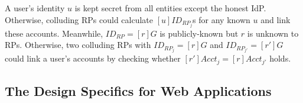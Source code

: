 A user's identity $u$ is kept secret from all entities except the honest IdP. Otherwise, colluding RPs could calculate $[u]ID_{RP_j}$s for any known $u$ and link these accounts.
Meanwhile, $ID_{RP} = [r]G$ is publicly-known but $r$ is unknown to RPs.
Otherwise, two colluding RPs with $ID_{RP_j} = [r]G$ and $ID_{RP_{j'}} = [r']G$ could link a user's accounts by checking whether $[r']Acct_j = [r]Acct_{j'}$ holds.

 




\subsection{The Design Specifics for Web Applications}
\label{sec:web-design}

